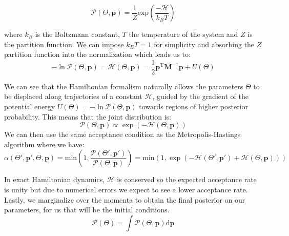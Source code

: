 \begin{equation}
    \mathcal{P}(\Theta, \textbf{p}) = \frac{1}{Z} \text{exp}\left(\frac{-\mathcal{H}}{k_B T} \right)
\end{equation}

where $k_B$ is the Boltzmann constant, $T$ the temperature of the system and $Z$ is the partition function. We can impose $k_B T=1$ for simplicity and 
absorbing the $Z$ partition function into the normalization which leads us to:
\begin{equation}
    -\ln \mathcal{P}(\Theta, \textbf{p}) = \mathcal{H}(\Theta, \textbf{p}) = \frac{1}{2} \textbf{p}^{\text{T}}\textbf{M}^{-1}\textbf{p} + U(\Theta)
\end{equation}

We can see that the Hamiltonian formalism naturally allows the parameters $\Theta$ to be displaced along trajectories of a constant $\mathcal{H}$, guided by the gradient 
of the potential energy $ U (\Theta) = -\ln \mathcal{P}(\Theta, \textbf{p})$ towards regions of higher posterior probability. This means that the joint distribution 
is:  
\begin{equation}
    \mathcal{P}(\Theta, \textbf{p}) \propto \exp(-\mathcal{H}(\Theta, \textbf{p}))
\end{equation}
We can then use the same acceptance condition as the Metropolis-Hastings algorithm where we have:
\begin{equation}
    \alpha(\Theta', \textbf{p}', \Theta, \textbf{p}) = \text{min}\left( 1, \frac{\mathcal{P}(\Theta', \textbf{p}')}{\mathcal{P}(\Theta, \textbf{p})} \right) = \text{min}\left( 1, \exp(-\mathcal{H}(\Theta', \textbf{p}') + \mathcal{H}(\Theta, \textbf{p})) \right)
\end{equation}

In exact Hamiltonian dynamics, $\mathcal{H}$ is conserved so the expected acceptance rate is unity but due to numerical errors we expect to see a lower acceptance rate. Lastly, 
we marginalize over the momenta to obtain the final posterior on our parameters, for us that will be the initial conditions. \\

\begin{equation}
    \mathcal{P}(\Theta) = \int \mathcal{P}(\Theta, \textbf{p}) \text{d} \textbf{p}
\end{equation}




